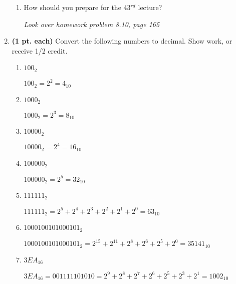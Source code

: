 \begin{enumerate}
\begin{enumerate}
	\item How should you prepare for the 43$^{rd}$ lecture?

	\begin{onlysolution}
	\itshape
	 Look over homework problem 8.10, page 165
	 \end{onlysolution}
	 
	\end{enumerate}

\item \textbf{ (1 pt. each)} Convert the following numbers to decimal. 
Show work, or receive 1/2 credit.
	\begin{enumerate}
	\item $100_2$
	\begin{onlysolution}	\itshape $100_2 = 2^2 = 4_{10}$\end{onlysolution}
	
	\item $1000_2$
	\begin{onlysolution}	\itshape $1000_2 = 2^3 = 8_{10}$\end{onlysolution}
	
	\item $10000_2$
	\begin{onlysolution}	\itshape $10000_2 = 2^4 = 16_{10}$\end{onlysolution}
	
	\item $100000_2$
	\begin{onlysolution}	\itshape $100000_2 = 2^5 = 32_{10}$\end{onlysolution}
	
	\item $111111_2$
	\begin{onlysolution}	\itshape $111111_2 = 2^5+2^4+2^3+2^2+2^1+2^0=63_{10}$\end{onlysolution}
	
	\item $1000100101000101_2$
	\begin{onlysolution}	\itshape $1000100101000101_2=2^{15}+2^{11}+2^8+2^6+2^5+2^0=35141_{10}$\end{onlysolution}
	
	\item $3EA_{16}$
	\begin{onlysolution}	\itshape$3EA_{16}=0011 1110 1010 = 2^9+2^8+2^7+2^6+2^5+2^3+2^1=1002_{10}$\end{onlysolution}
	
     \end{enumerate}



\end{enumerate}
